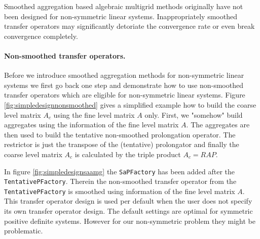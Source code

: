 \documentclass[12pt,a4paper]{article}
\begin{document}
Smoothed aggregation based algebraic multigrid methods originally have not been designed for non-symmetric linear systems. Inappropriately smoothed transfer operators may significantly detoriate the convergence rate or even break convergence completely. 

\paragraph{Non-smoothed transfer operators.}
Before we introduce smoothed aggregation methods for non-symmetric linear systems we first go back one step and demonstrate how to use non-smoothed transfer operators which are eligible for non-symmetric linear systems. Figure \ref{fig:simpledesignnonsmoothed} gives a simplified example how to build the coarse level matrix $A_c$ using the fine level matrix $A$ only. First, we "somehow" build aggregates using the information of the fine level matrix $A$. The aggregates are then used to build the tentative non-smoothed prolongation operator. The restrictor is just the transpose of the (tentative) prolongator and finally the coarse level matrix $A_c$ is calculated by the triple product $A_c=RAP$.

In figure \ref{fig:simpledesignsaamg} the \verb|SaPFactory| has been added after the \verb|TentativePFactory|. Therein the non-smoothed transfer operator from the \verb|TentativePFactory| is smoothed using information of the fine level matrix $A$. This transfer operator design is used per default when the user does not specify its own transfer operator design. The default settings are optimal for symmetric positive definite systems. However for our non-symmetric problem they might be problematic.
\end{document}
